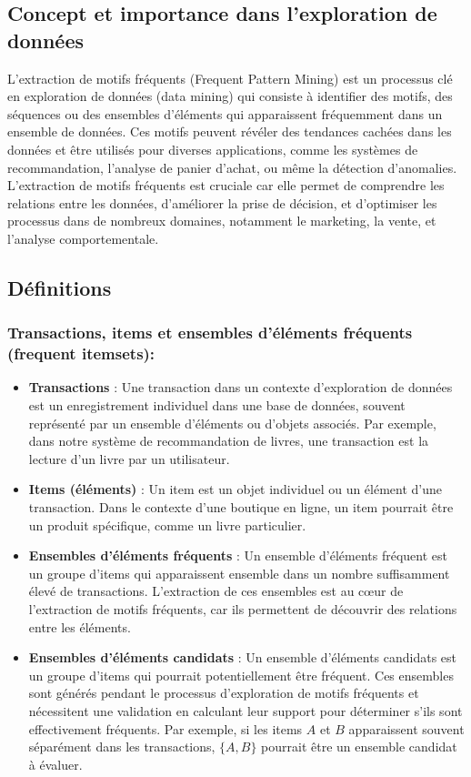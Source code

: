 \documentclass[a4paper, 12pt]{article}
\begin{document}
\subsection{Concept et importance dans l'exploration de données}
L'extraction de motifs fréquents (Frequent Pattern Mining) est un processus clé en exploration de données (data mining) qui consiste à identifier des motifs, des séquences ou des ensembles d'éléments qui apparaissent fréquemment dans un ensemble de données. Ces motifs peuvent révéler des tendances cachées dans les données et être utilisés pour diverses applications, comme les systèmes de recommandation, l'analyse de panier d'achat, ou même la détection d'anomalies. L'extraction de motifs fréquents est cruciale car elle permet de comprendre les relations entre les données, d'améliorer la prise de décision, et d'optimiser les processus dans de nombreux domaines, notamment le marketing, la vente, et l'analyse comportementale.

\subsection{Définitions}


\subsubsection{Transactions, items et ensembles d'éléments fréquents (frequent itemsets):}
\begin{itemize}
    \item \textbf{Transactions} : Une transaction dans un contexte d'exploration de données est un enregistrement individuel dans une base de données, souvent représenté par un ensemble d'éléments ou d'objets associés. Par exemple, dans notre système de recommandation de livres, une transaction est la lecture d'un livre par un utilisateur.
    \item \textbf{Items (éléments)} : Un item est un objet individuel ou un élément d'une transaction. Dans le contexte d'une boutique en ligne, un item pourrait être un produit spécifique, comme un livre particulier.
    \item \textbf{Ensembles d'éléments fréquents} : Un ensemble d'éléments fréquent est un groupe d'items qui apparaissent ensemble dans un nombre suffisamment élevé de transactions. L'extraction de ces ensembles est au cœur de l'extraction de motifs fréquents, car ils permettent de découvrir des relations entre les éléments.
    \item \textbf{Ensembles d'éléments candidats} : Un ensemble d'éléments candidats est un groupe d'items qui pourrait potentiellement être fréquent. Ces ensembles sont générés pendant le processus d'exploration de motifs fréquents et nécessitent une validation en calculant leur support pour déterminer s'ils sont effectivement fréquents. Par exemple, si les items \(A\) et \(B\) apparaissent souvent séparément dans les transactions, \( \{A, B\} \) pourrait être un ensemble candidat à évaluer.
\end{itemize}
    
\end{document}

